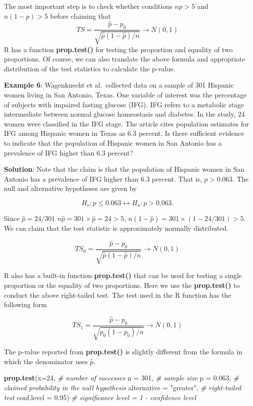 \documentclass[
]{book}
\newenvironment{Shaded}{\begin{snugshade}}{\end{snugshade}}
\newcommand{\AttributeTok}[1]{\textcolor[rgb]{0.13,0.29,0.53}{#1}}
\newcommand{\CommentTok}[1]{\textcolor[rgb]{0.56,0.35,0.01}{\textit{#1}}}
\newcommand{\DecValTok}[1]{\textcolor[rgb]{0.00,0.00,0.81}{#1}}
\newcommand{\FloatTok}[1]{\textcolor[rgb]{0.00,0.00,0.81}{#1}}
\newcommand{\FunctionTok}[1]{\textcolor[rgb]{0.13,0.29,0.53}{\textbf{#1}}}
\newcommand{\NormalTok}[1]{#1}
\newcommand{\StringTok}[1]{\textcolor[rgb]{0.31,0.60,0.02}{#1}}
\begin{document}
The most important step is to check whether conditions \(np > 5\) and \(n(1-p) > 5\) before claiming that
\[
TS = \frac{\hat{p}-p_0}{\sqrt{\hat{p}(1-\hat{p})/n}} \to N(0,1)
\]
R has a function \textbf{prop.test()} for testing the proportion and equality of two proportions. Of course, we can also translate the above formula and appropriate distribution of the test statistics to calculate the p-value.

\textbf{Example 6}: Wagenknecht et al.~collected data on a sample of 301 Hispanic women living in San Antonio, Texas. One variable of interest was the percentage of subjects with impaired fasting glucose (IFG). IFG refers to a metabolic stage intermediate between normal glucose homeostasis and diabetes. In the study, 24 women were classified in the IFG stage. The article cites population estimates for IFG among Hispanic women in Texas as 6.3 percent. Is there sufficient evidence to indicate that the population of Hispanic women in San Antonio has a prevalence of IFG higher than 6.3 percent?

\textbf{Solution}: Note that the claim is that the population of Hispanic women in San Antonio has a prevalence of IFG higher than 6.3 percent. That is, \(p > 0.063\). The null and alternative hypotheses are given by

\[
H_o: p \le 0.063  \leftrightarrow  H_a: p > 0.063.
\]

Since \(\hat{p} = 24/301\) \(n\hat{p} = 301\times\hat{p} = 24 > 5\), \(n(1-\hat{p}) = 301\times(1-24/301) > 5\). We can claim that the test statistic is approximately normally distributed.

\[
TS_0 = \frac{\hat{p}-p_0}{\sqrt{\hat{p}(1-\hat{p})/n}} \to N(0,1)
\]

R also has a built-in function \textbf{prop.test()} that can be used for testing a single proportion or the equality of two proportions. Here we use the \textbf{prop.test()} to conduct the above right-tailed test. The test used in the R function has the following form

\[
TS_1 = \frac{\hat{p}-p_0}{\sqrt{p_0(1-p_0)/n}} \to N(0,1)
\]

The p-value reported from \textbf{prop.test()} is slightly different from the formula in which the denominator uses \(\hat{p}\).

\begin{Shaded}
\begin{Highlighting}[]
\FunctionTok{prop.test}\NormalTok{(}\AttributeTok{x=}\DecValTok{24}\NormalTok{,                     }\CommentTok{\# number of successes}
          \AttributeTok{n =} \DecValTok{301}\NormalTok{,                  }\CommentTok{\# sample size}
          \AttributeTok{p =} \FloatTok{0.063}\NormalTok{,                }\CommentTok{\# claimed probability in the null hypothesis}
          \AttributeTok{alternative =} \StringTok{"greater"}\NormalTok{,  }\CommentTok{\# right{-}tailed test}
          \AttributeTok{conf.level =} \FloatTok{0.95}\NormalTok{)        }\CommentTok{\# significance level = 1 {-} confidence level}
\end{Highlighting}
\end{Shaded}
\end{document}
